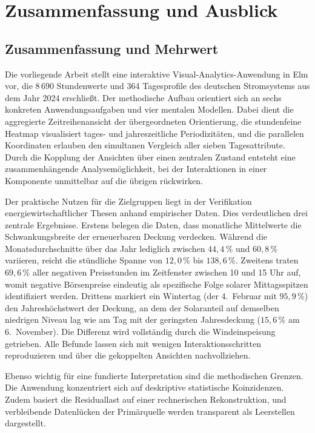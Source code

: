 \section{Zusammenfassung und Ausblick}\label{sec:ausblick}

\subsection*{Zusammenfassung und Mehrwert}

Die vorliegende Arbeit stellt eine interaktive Visual-Analytics-Anwendung in Elm vor, die $8\,690$ Stundenwerte und 364 Tagesprofile des deutschen Stromsystems aus dem Jahr 2024 erschließt. Der methodische Aufbau orientiert sich an sechs konkreten Anwendungsaufgaben und vier mentalen Modellen. Dabei dient die aggregierte Zeitreihenansicht der übergeordneten Orientierung, die stundenfeine Heatmap visualisiert tages- und jahreszeitliche Periodizitäten, und die parallelen Koordinaten erlauben den simultanen Vergleich aller sieben Tagesattribute. Durch die Kopplung der Ansichten über einen zentralen Zustand entsteht eine zusammenhängende Analysemöglichkeit, bei der Interaktionen in einer Komponente unmittelbar auf die übrigen rückwirken.

Der praktische Nutzen für die Zielgruppen liegt in der Verifikation energiewirtschaftlicher Thesen anhand empirischer Daten. Dies verdeutlichen drei zentrale Ergebnisse.
Erstens belegen die Daten, dass monatliche Mittelwerte die Schwankungsbreite der erneuerbaren Deckung verdecken. Während die Monatsdurchschnitte über das Jahr lediglich zwischen $44{,}4\,\%$ und $60{,}8\,\%$ variieren, reicht die stündliche Spanne von $12{,}0\,\%$ bis $138{,}6\,\%$.
Zweitens traten $69{,}6\,\%$ aller negativen Preisstunden im Zeitfenster zwischen 10 und 15 Uhr auf, womit negative Börsenpreise eindeutig als spezifische Folge solarer Mittagsspitzen identifiziert werden.
Drittens markiert ein Wintertag (der 4.\ Februar mit $95{,}9\,\%$) den Jahreshöchstwert der Deckung, an dem der Solaranteil auf demselben niedrigen Niveau lag wie am Tag mit der geringsten Jahresdeckung ($15{,}6\,\%$ am 6.\ November). Die Differenz wird vollständig durch die Windeinspeisung getrieben. Alle Befunde lassen sich mit wenigen Interaktionsschritten reproduzieren und über die gekoppelten Ansichten nachvollziehen.

Ebenso wichtig für eine fundierte Interpretation sind die methodischen Grenzen. Die Anwendung konzentriert sich auf deskriptive statistische Koinzidenzen. Zudem basiert die Residuallast auf einer rechnerischen Rekonstruktion, und verbleibende Datenlücken der Primärquelle werden transparent als Leerstellen dargestellt.

